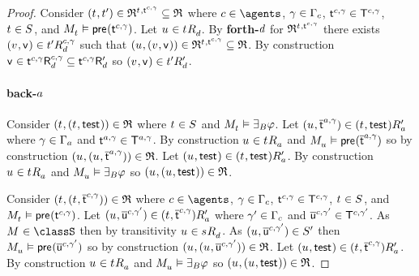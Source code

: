 \begin{proof}
Consider $(\kStateT, \kStateTP) \in \refinement^{\kStateT, \aStateT[\agentC, \gamma]} \subseteq \refinement$ where $\agentC \in \agents$, $\gamma \in \Gamma_\agentC$, $\aStateT[\agentC, \gamma] \in \aStatesT[\agentC, \gamma]$, $\kStateT \in \kStates$, and $\kPModel{\kStateT} \entails \aPrecondition(\aStateT[\agentC, \gamma])$.
Let $\kStateU \in \kSuccessorsD{\kStateT}$.
By {\bf forth-$\agentD$} for $\refinement^{\kStateT, \aStateT[\agentC, \gamma]}$ there exists $(\kStateV, \aStateV) \in \kSuccessorsD[\agentC, \gamma]{\kStateTP}$ such that $(\kStateU, (\kStateV, \aStateV)) \in \refinement^{\kStateT, \aStateT[\agentC, \gamma]} \subseteq \refinement$.
By construction $\aStateV \in \aSuccessorsD[\agentC, \gamma]{\aStateT[\agentC, \gamma]} \subseteq \aSuccessorsPD{\aStateT[\agentC, \gamma]}$ so $(\kStateV, \aStateV) \in \kSuccessorsPD{\kStateTP}$.

\paragraph{back-$\agentA$}
Consider $(\kStateT, (\kStateT, \aStateTest)) \in \refinement$ where $\kStateT \in \kStates$ and $\kPModel{\kStateT} \entails \someactsBs \phi$.
Let $(\kStateU, \aPStateT[\agentA, \gamma]) \in \kSuccessorsPA{(\kStateT, \aStateTest)}$ where $\gamma \in \Gamma_\agentA$ and $\aStateT[\agentA, \gamma] \in \aStatesT[\agentA, \gamma]$.
By construction $\kStateU \in \kSuccessorsA{\kStateT}$ and $\kPModel{\kStateU} \entails \aPrecondition(\aPStateT[\agentA, \gamma])$ so by construction $(\kStateU, (\kStateU, \aPStateT[\agentA, \gamma])) \in \refinement$.
Let $(\kStateU, \aStateTest) \in \kSuccessorsPA{(\kStateT, \aStateTest)}$.
By construction $\kStateU \in \kSuccessorsA{\kStateT}$ and $\kPModel{\kStateU} \entails \somerefsBs \phi$ so $(\kStateU, (\kStateU, \aStateTest)) \in \refinement$.

Consider $(\kStateT, (\kStateT, \aPStateT[\agentC, \gamma])) \in \refinement$ where $\agentC \in \agents$, $\gamma \in \Gamma_\agentC$, $\aStateT[\agentC, \gamma] \in \aStatesT[\agentC, \gamma]$, $\kStateT \in \kStates$, and $\kPModel{\kStateT} \entails \aPrecondition(\aStateT[\agentC, \gamma])$.
Let $(\kStateU, \aPStateU[\agentC, \gamma']) \in \kSuccessorsPA{(\kStateT, \aPStateT[\agentC, \gamma])}$ where $\gamma' \in \Gamma_\agentC$ and $\aPStateU[\agentC, \gamma'] \in \aStatesT[\agentC, \gamma']$.
As $\kModel \in \classS$ then by transitivity $\kStateU \in \kSuccessorsD{\kStateS}$.
As $(\kStateU, \aPStateU[\agentC, \gamma']) \in \kStatesP$ then $\kPModel{\kStateU} \entails \aPrecondition(\aPStateU[\agentC, \gamma'])$ so by construction $(\kStateU, (\kStateU, \aPStateU[\agentC, \gamma'])) \in \refinement$.
Let $(\kStateU, \aStateTest) \in \kSuccessorsPA{(\kStateT, \aPStateT[\agentC, \gamma])}$.
By construction $\kStateU \in \kSuccessorsA{\kStateT}$ and $\kPModel{\kStateU} \entails \somerefsBs \phi$ so $(\kStateU, (\kStateU, \aStateTest)) \in \refinement$.


\end{proof}
